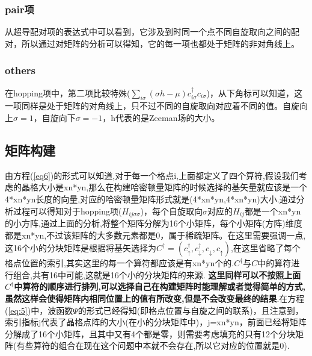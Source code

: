 \documentclass[a4paper,12pt]{ctexart}
\numberwithin{equation}{section}
\begin{document}
\subsubsection{pair项}
从超导配对项的表达式中可以看到，它涉及到时同一个点不同自旋取向之间的配对，所以通过对矩阵的分析可以得知，它的每一项也都处于矩阵的非对角线上。
\subsubsection{others}
在hopping项中，第二项比较特殊($\sum_{i\sigma}(\sigma h-\mu)c_{i\sigma}^\dagger c_{i\sigma}$)，从下角标可以知道，这一项同样是处于矩阵的对角线上，只不过不同的自旋取向对应着不同的值。自旋向上$\sigma=1$，自旋向下$\sigma=-1$，h代表的是Zeeman场的大小。

\subsection{矩阵构建}
由方程(\ref{eq6})的形式可以知道,对于每一个格点i,上面都定义了四个算符,假设我们考虑的晶格大小是xn*yn,那么在构建哈密顿量矩阵的时候选择的基矢量就应该是一个4*xn*yn长度的向量,对应的哈密顿量矩阵形式就是(4*xn*yn,4*xn*yn)大小.通过分析过程可以得知对于hopping项($H_{ij\sigma\sigma}$)，每个自旋取向$\sigma$对应的$H_{ij}$都是一个xn*yn的小方阵,通过上面的分析,将整个矩阵分解为16个小矩阵，每个小矩阵(方阵)维度都是xn*yn,不过该矩阵的大多数元素都是0，属于稀疏矩阵。在这里需要强调一点,这16个小的分块矩阵是根据将基矢选择为$C^\dagger=(c_\uparrow^\dagger,c_\downarrow^\dagger,c_\downarrow,c_\uparrow)$,在这里省略了每个格点位置的索引,其实这里的每一个算符都应该是有xn*yn个的.$C^\dagger$与$C$中的算符进行组合,共有16中可能,这就是16个小的分块矩阵的来源.
\textbf{这里同样可以不按照上面$C^\dagger$中算符的顺序进行排列,可以选择自己在构建矩阵时能理解或者觉得简单的方式,虽然这样会使得矩阵内相同位置上的值有所改变,但是不会改变最终的结果}.在方程(\ref{eq:5})中，波函数$\Psi$的形式已经得知(即格点位置与自旋之间的联系)，且注意到，索引指标j代表了晶格点阵的大小(在小的分块矩阵中)，j=xn*yn，前面已经将矩阵分解成了16个小矩阵，且其中又有4个都是零，则需要考虑填充的只有12个分块矩阵(有些算符的组合在现在这个问题中本就不会存在,所以它对应的位置就是0).
\end{document}
